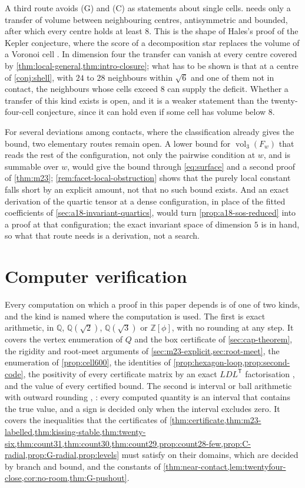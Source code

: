 \documentclass[11pt,reqno]{amsart}
\renewcommand{\_}{\origunderscore\allowbreak}
\numberwithin{equation}{section}
\theoremstyle{plain}
\theoremstyle{definition}
\theoremstyle{remark}
\DeclareMathOperator{\vol}{vol}
\begin{document}
A third route avoids (G) and (C) as statements about single cells.
 needs only a transfer of volume between
neighbouring centres, antisymmetric and bounded, after which every centre
holds at least $8$. This is the shape of Hales's proof of the Kepler
conjecture, where the score of a decomposition star replaces the volume of
a Voronoi cell \cite{Hal05}. In dimension four the transfer can vanish at
every centre covered by \cref{thm:local-general,thm:intro-closure}; what
has to be shown is that at a centre of \cref{conj:shell}, with $24$ to
$28$ neighbours within $\sqrt6$ and one of them not in contact, the
neighbours whose cells exceed $8$ can supply the deficit. Whether a
transfer of this kind exists is open, and it is a weaker statement than
the twenty-four-cell conjecture, since it can hold even if some cell has
volume below $8$.

For several deviations among contacts, where the classification already
gives the bound, two elementary routes remain open. A lower bound for
$\vol_3(F_w)$ that reads the rest of the configuration, not only the
pairwise condition at $w$, and is summable over $w$, would give the bound
through \eqref{eq:surface} and a second proof of \cref{thm:m23};
\cref{rem:facet-local-obstruction} shows that the purely local constant
falls short by an explicit amount, not that no such bound exists. And an
exact derivation of the quartic tensor at a dense configuration, in place
of the fitted coefficients of \cref{sec:a18-invariant-quartics}, would turn
\cref{prop:a18-sos-reduced} into a proof at that configuration; the exact
invariant space of dimension $5$ is in hand, so what that route needs is a
derivation, not a search.

\section{Computer verification}\label{sec:reproducibility-new}

Every computation on which a proof in this paper depends is of one of two
kinds, and the kind is named where the computation is used. The first is
exact arithmetic, in $\mathbb{Q}$, $\mathbb{Q}(\sqrt2)$, $\mathbb{Q}(\sqrt3)$
or $\mathbb{Z}[\phi]$, with no rounding at any step. It covers the vertex
enumeration of $Q$ and the box certificate of \cref{sec:cap-theorem}, the
rigidity and root-meet arguments of \cref{sec:m23-explicit,sec:root-meet},
the enumeration of \cref{prop:cell600}, the identities of
\cref{prop:hexagon-loop,prop:second-code}, the positivity of every
certificate matrix by an exact $LDL^{\mathsf T}$ factorisation
\cite[\S4.1]{GVL13}, and the value of every certified bound. The second is
interval or ball arithmetic with outward rounding \cite[Ch.~5]{MKC09},
\cite{Joh17}: every computed quantity is an interval that contains the true
value, and a sign is decided only when the interval excludes zero. It covers
the inequalities that the certificates of
\cref{thm:certificate,thm:m23-labelled,thm:kissing-stable,thm:twenty-six,thm:count31,thm:count30,thm:count29,prop:count28-few,prop:C-radial,prop:G-radial,prop:levels}
must satisfy on their domains, which are decided by branch and bound, and
the constants of \cref{thm:near-contact,lem:twentyfour-close,cor:no-room,thm:G-pushout}.
\end{document}
